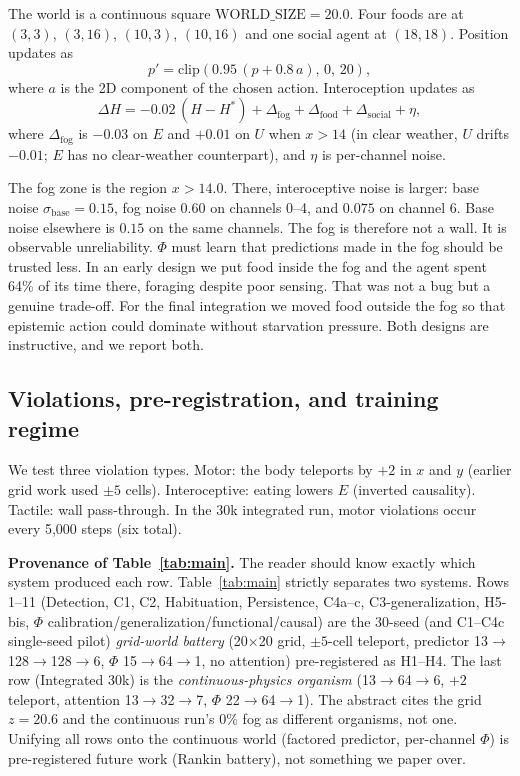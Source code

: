 \documentclass[11pt,a4paper]{article}
\begin{document}
The world is a continuous square $\mathrm{WORLD\_SIZE}=20.0$. Four foods are at $(3,3)$, $(3,16)$, $(10,3)$, $(10,16)$ and one social agent at $(18,18)$. Position updates as
\begin{equation}
p' = \mathrm{clip}(0.95 \,(p + 0.8\,a),\, 0,\, 20),
\end{equation}
where $a$ is the 2D component of the chosen action. Interoception updates as
\begin{equation}
\Delta H = -0.02\,(H-H^*) + \Delta_{\mathrm{fog}} + \Delta_{\mathrm{food}} + \Delta_{\mathrm{social}} + \eta,
\end{equation}
where $\Delta_{\mathrm{fog}}$ is $-0.03$ on $E$ and $+0.01$ on $U$ when $x>14$ (in clear weather, $U$ drifts $-0.01$; $E$ has no clear-weather counterpart), and $\eta$ is per-channel noise.

The fog zone is the region $x>14.0$. There, interoceptive noise is larger: base noise $\sigma_{\mathrm{base}}=0.15$, fog noise $0.60$ on channels 0--4, and $0.075$ on channel 6. Base noise elsewhere is $0.15$ on the same channels. The fog is therefore not a wall. It is observable unreliability. $\Phi$ must learn that predictions made in the fog should be trusted less. In an early design we put food inside the fog and the agent spent 64\% of its time there, foraging despite poor sensing. That was not a bug but a genuine trade-off. For the final integration we moved food outside the fog so that epistemic action could dominate without starvation pressure. Both designs are instructive, and we report both.

\subsection{Violations, pre-registration, and training regime}

We test three violation types. Motor: the body teleports by $+2$ in $x$ and $y$ (earlier grid work used $\pm5$ cells). Interoceptive: eating lowers $E$ (inverted causality). Tactile: wall pass-through. In the 30k integrated run, motor violations occur every 5,000 steps (six total).

\textbf{Provenance of Table~\ref{tab:main}.} The reader should know exactly which system produced each row. Table~\ref{tab:main} strictly separates two systems. Rows 1--11 (Detection, C1, C2, Habituation, Persistence, C4a--c, C3-generalization, H5-bis, $\Phi$ calibration/generalization/functional/causal) are the 30-seed (and C1--C4c single-seed pilot) \textit{grid-world battery} (20$\times$20 grid, $\pm5$-cell teleport, predictor 13$\rightarrow$128$\rightarrow$128$\rightarrow$6, $\Phi$ 15$\rightarrow$64$\rightarrow$1, no attention) pre-registered as H1--H4. The last row (Integrated 30k) is the \textit{continuous-physics organism} (13$\rightarrow$64$\rightarrow$6, $+2$ teleport, attention 13$\rightarrow$32$\rightarrow$7, $\Phi$ 22$\rightarrow$64$\rightarrow$1). The abstract cites the grid $z=20.6$ and the continuous run's 0\% fog as different organisms, not one. Unifying all rows onto the continuous world (factored predictor, per-channel $\Phi$) is pre-registered future work (Rankin battery), not something we paper over.
\end{document}
